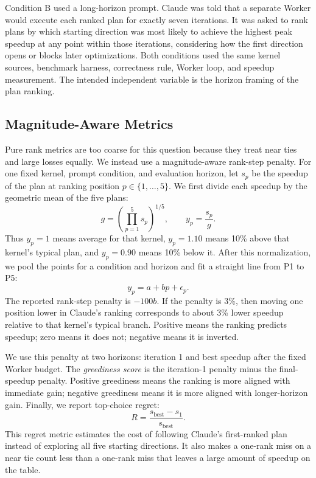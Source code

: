\documentclass[conference]{IEEEtran}
\begin{document}
Condition B used a long-horizon prompt. Claude was told that a separate Worker
would execute each ranked plan for exactly seven iterations. It was asked to
rank plans by which starting direction was most likely to achieve the highest
peak speedup at any point within those iterations, considering how the first
direction opens or blocks later optimizations. Both conditions used the same
kernel sources, benchmark harness, correctness rule, Worker loop, and speedup
measurement. The intended independent variable is the horizon framing of the
plan ranking.

\subsection{Magnitude-Aware Metrics}

Pure rank metrics are too coarse for this question because they treat near ties
and large losses equally. We instead use a magnitude-aware rank-step penalty.
For one fixed kernel, prompt condition, and evaluation horizon, let $s_p$ be
the speedup of the plan at ranking position $p\in\{1,\ldots,5\}$. We first
divide each speedup by the geometric mean of the five plans:
\begin{equation}
g=\left(\prod_{p=1}^{5}s_p\right)^{1/5}, \qquad y_p=\frac{s_p}{g}.
\end{equation}
Thus $y_p=1$ means average for that kernel, $y_p=1.10$ means 10\% above that
kernel's typical plan, and $y_p=0.90$ means 10\% below it. After this
normalization, we pool the points for a condition and horizon and fit a straight
line from P1 to P5:
\begin{equation}
y_p = a + bp + \epsilon_p .
\end{equation}
The reported rank-step penalty is $-100b$. If the penalty is 3\%, then moving
one position lower in Claude's ranking corresponds to about 3\% lower speedup
relative to that kernel's typical branch. Positive means the ranking predicts
speedup; zero means it does not; negative means it is inverted.

We use this penalty at two horizons: iteration 1 and best speedup after the
fixed Worker budget. The \emph{greediness score} is the iteration-1 penalty
minus the final-speedup penalty. Positive greediness means the ranking is more
aligned with immediate gain; negative greediness means it is more aligned with
longer-horizon gain. Finally, we report top-choice regret:
\begin{equation}
R=\frac{s_{\mathrm{best}}-s_1}{s_{\mathrm{best}}}.
\end{equation}
This regret metric estimates the cost of following Claude's first-ranked plan
instead of exploring all five starting directions.
It also makes a one-rank miss on a near tie count less than a one-rank miss
that leaves a large amount of speedup on the table.
\end{document}
